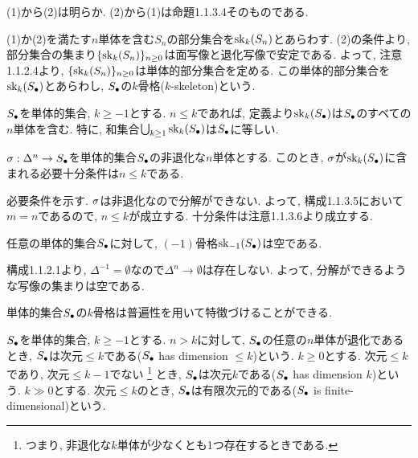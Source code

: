 \documentclass[uplatex, a4paper, 14Q, dvipdfmx]{jsreport}
\begin{document}
\begin{Proof}
  (1)から(2)は明らか. 
  (2)から(1)は命題1.1.3.4そのものである. 
\end{Proof}

(1)か(2)を満たす$n$単体を含む$S_n$の部分集合を$\sk_k(S_n)$とあらわす. 
(2)の条件より, 部分集合の集まり$\{\sk_k(S_n)\}_{n \geq 0}$は面写像と退化写像で安定である. 
よって, 注意1.1.2.4より, $\{\sk_k(S_n)\}_{n \geq 0}$は単体的部分集合を定める. 
この単体的部分集合を$\sk_k(\S)$とあらわし, $\S$の$k$骨格($k$-skeleton)という. 

\begin{remark}
  $\S$を単体的集合, $k \geq -1$とする. 
  $n \leq k$であれば, 定義より$\sk_k(\S)$は$\S$のすべての$n$単体を含む. 
  特に, 和集合$\bigcup_{k \geq 1} \sk_k(\S)$は$\S$に等しい. 
\end{remark}

\begin{remark}
  $\si: \Delta^n \to \S$を単体的集合$\S$の非退化な$n$単体とする.
  このとき, $\si$が$\sk_k(\S)$に含まれる必要十分条件は$n \leq k$である.
\end{remark}

\begin{Proof}
  必要条件を示す. 
  $\si$は非退化なので分解ができない. 
  よって, 構成1.1.3.5において$m=n$であるので, $n \leq k$が成立する. 
  十分条件は注意1.1.3.6より成立する.
\end{Proof}

\begin{example}
  任意の単体的集合$\S$に対して, $(-1)$骨格$\sk_{-1}(\S)$は空である. 
\end{example}

\begin{Proof}
  構成1.1.2.1より, $\Delta^{-1}=\emptyset$なので$\Delta^n \to \emptyset$は存在しない.
  よって, 分解ができるような写像の集まりは空である. 
\end{Proof}

単体的集合$\S$の$k$骨格は普遍性を用いて特徴づけることができる. 

\begin{definition}
  $\S$を単体的集合, $k \geq -1$とする. 
  $n>k$に対して, $\S$の任意の$n$単体が退化であるとき, $\S$は次元$\leq k$である($\S$ has dimension $\leq k$)という. 
  $k \geq 0$とする. 
  次元$\leq k$であり, 次元$\leq k-1$でない
  \footnote{
    つまり, 非退化な$k$単体が少なくとも1つ存在するときである. 
  }
  とき, $\S$は次元$k$である($\S$ has dimension $k$)という. 
  $k \gg 0$とする. 
  次元$\leq k$のとき, $\S$は有限次元的である($\S$ is finite-dimensional)という.
\end{definition}
\end{document}
